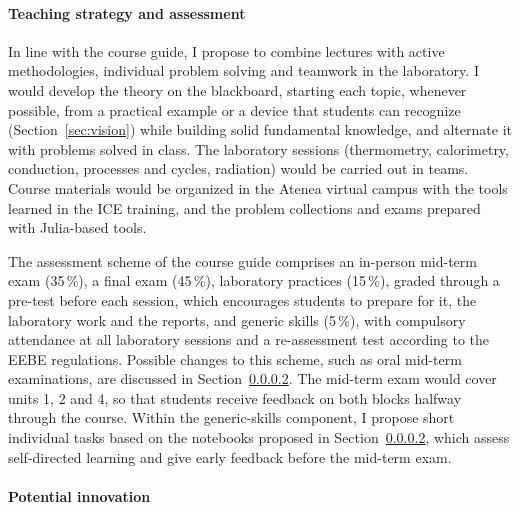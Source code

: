 \documentclass[11pt]{article}
\begin{document}
\paragraph{Teaching strategy and assessment}\label{sec:ttc-assessment}

In line with the course guide, I propose to combine lectures with active methodologies, individual problem solving and teamwork in the laboratory. 
I would develop the theory on the blackboard, starting each topic, whenever possible, from a practical example or a device that students can recognize (Section~\ref{sec:vision}) while building solid fundamental knowledge, and alternate it with problems solved in class. 
The laboratory sessions (thermometry, calorimetry, conduction, processes and cycles, radiation) would be carried out in teams. 
Course materials would be organized in the Atenea virtual campus with the tools learned in the ICE training, and the problem collections and exams prepared with Julia-based tools.

The assessment scheme of the course guide comprises an in-person mid-term exam (35\,\%), a final exam
(45\,\%), laboratory practices (15\,\%), graded through a pre-test before each session, which encourages students to prepare for it, the laboratory work and the reports, and generic skills (5\,\%), with compulsory attendance at all laboratory sessions and a re-assessment test according to the EEBE regulations. Possible changes to this scheme, such as oral mid-term examinations, are discussed in Section~\ref{sec:ttc-innovation}.
The mid-term exam would cover units 1, 2 and 4, so that students receive feedback on both blocks halfway through the course. 
Within the generic-skills component, I propose short individual tasks based on the notebooks proposed in Section~\ref{sec:ttc-innovation}, which assess self-directed learning and give early feedback before the mid-term exam.

\paragraph{Potential innovation} \label{sec:ttc-innovation}
\end{document}
